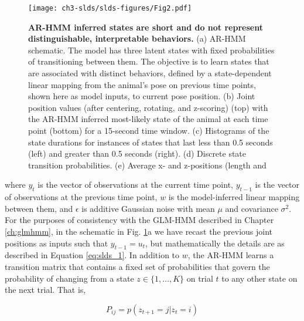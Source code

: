 \begin{figure}[t!]
  \begin{center}
    \texttt{[image: ch3-slds/slds-figures/Fig2.pdf]}
    \caption[AR-HMM inferred states are short and do not represent distinguishable, interpretable behaviors]{\textbf{AR-HMM inferred states are short and do not represent distinguishable, interpretable behaviors.} (a) AR-HMM schematic. The model has three latent states with fixed probabilities of transitioning between them. The objective is to learn states that are associated with distinct behaviors, defined by a state-dependent linear mapping from the animal's pose on previous time points, shown here as model inputs, to current pose position. (b) Joint position values (after centering, rotating, and z-scoring) (top) with the AR-HMM inferred most-likely state of the animal at each time point (bottom) for a 15-second time window. (c) Histograms of the state durations for instances of states that last less than 0.5 seconds (left) and greater than 0.5 seconds (right). (d) Discrete state transition probabilities. (e) Average x- and z-positions (length and }
    \label{fig:slds:2}
  \end{center}
  \vspace{-0.5cm}
\end{figure}
\begin{figure}[t!]
\end{figure}
where $y_t$ is the vector of observations at the current time point, $y_{t-1}$ is the vector of observations at the previous time point, $w$ is the model-inferred linear mapping between them, and $\epsilon$ is additive Gaussian noise with mean $\mu$ and covariance $\sigma^2$. For the purposes of consistency with the GLM-HMM described in Chapter \ref{ch:glmhmm}, in the schematic in Fig. \ref{fig:slds:2}a we have recast the previous joint positions as inputs such that $y_{t-1}=u_t$, but mathematically the details are as described in Equation \ref{eq:slds_1}. In addition to $w$, the AR-HMM learns a transition matrix that contains a fixed set of probabilities that govern the probability of changing from a state $z \in \{ 1, \ldots ,K\}$ on trial $t$ to any other state on the next trial. That is, 

\begin{equation}
\label{eq:slds_2}
    P_{ij} = p\left( {z_{t + 1} = j|z_t = i} \right)
\end{equation}

